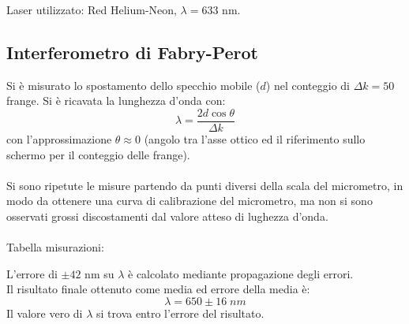 Laser utilizzato: Red Helium-Neon, $\lambda = 633$ nm.

\subsection{Interferometro di Fabry-Perot}

Si è misurato lo spostamento dello specchio mobile ($d$) nel conteggio di $\Delta k = 50 $ frange. Si è ricavata la lunghezza d'onda con:
$$\lambda = \frac{ 2 d \cos \theta }{\Delta k} $$
con l'approssimazione $\theta \approx 0$ (angolo tra l'asse ottico ed il riferimento sullo schermo per il conteggio delle frange).\\\\
%
Si sono ripetute le misure partendo da punti diversi della scala del micrometro, in modo da ottenere una curva di calibrazione del micrometro, ma non si sono osservati grossi discostamenti dal valore atteso di lughezza d'onda.\\\\
%
Tabella misurazioni:
%


%
L'errore di $\pm 42$ nm su $\lambda$ è calcolato mediante propagazione degli errori.\\
Il risultato finale ottenuto come media ed errore della media è:
$$\lambda = 650 \pm 16\; nm $$
Il valore vero di $\lambda$ si trova entro l'errore del risultato.
%

